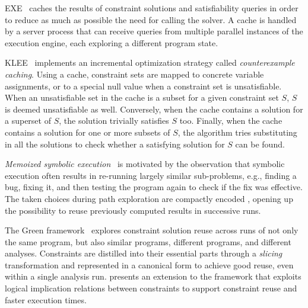 {\sc EXE}~\cite{EXE-CCS06} caches the results of constraint solutions and satisfiability queries in order to reduce as much as possible the need for calling the solver. A cache is handled by a server process that can receive queries from multiple parallel instances of the execution engine, each exploring a different program state.

{\sc KLEE}~\cite{KLEE-OSDI08} implements an incremental optimization strategy called {\em counterexample caching}. Using a cache, constraint sets are mapped to concrete variable assignments, or to a special null value when a constraint set is unsatisfiable. When an unsatisfiable set in the cache is a subset for a given constraint set $S$, $S$ is deemed unsatisfiable as well. Conversely, when the cache contains a solution for a superset of $S$, the solution trivially satisfies $S$ too. Finally, when the cache contains a solution for one or more subsets of $S$, the algorithm tries substituting in all the solutions to check whether a satisfying solution for $S$ can be found.

{\em Memoized symbolic execution}~\cite{MEMO-ISSTA12} is motivated by the observation that symbolic execution often results in re-running largely similar sub-problems, e.g., finding a bug, fixing it, and then testing the program again to check if the fix was effective. The taken choices during path exploration are compactly encoded , opening up the possibility to reuse previously computed results in successive runs.

The Green framework~\cite{GREEN-FSE12} explores constraint solution reuse across runs of not only the same program, but also similar programs, different programs, and different analyses. Constraints are distilled into their essential parts through a {\em slicing} transformation and represented in a canonical form to achieve good reuse, even within a single analysis run. \cite{JGY-ISSTA15} presents an extension to the framework that exploits logical implication relations between constraints to support constraint reuse and faster execution times.


